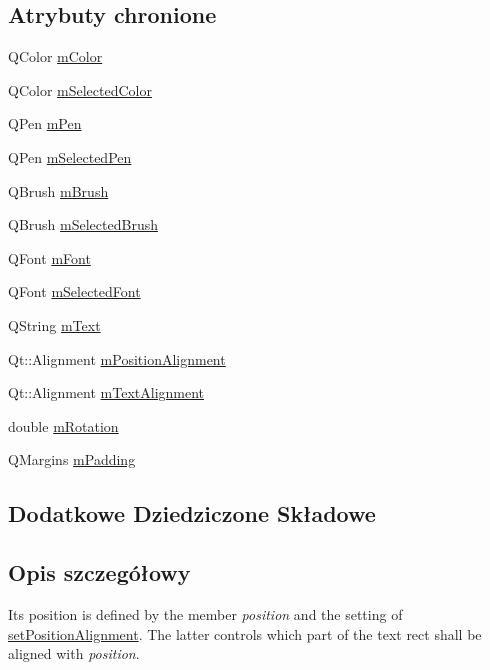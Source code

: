 \subsection*{Atrybuty chronione}
\begin{DoxyCompactItemize}
\item 
Q\+Color \hyperlink{class_q_c_p_item_text_a8407f284ad867f627878cc26ef433d08}{m\+Color}
\item 
Q\+Color \hyperlink{class_q_c_p_item_text_a7eb64e42f5f7998a97d8907ad25933c1}{m\+Selected\+Color}
\item 
Q\+Pen \hyperlink{class_q_c_p_item_text_aa02388705dbbff1bf7b8aa872b5f579c}{m\+Pen}
\item 
Q\+Pen \hyperlink{class_q_c_p_item_text_a8eaec649606d6ead2d8d4dcb5691777c}{m\+Selected\+Pen}
\item 
Q\+Brush \hyperlink{class_q_c_p_item_text_a2535911875faa459b8337f2efccb5cb8}{m\+Brush}
\item 
Q\+Brush \hyperlink{class_q_c_p_item_text_a28ccd097b42a216d81db9c6869f54a59}{m\+Selected\+Brush}
\item 
Q\+Font \hyperlink{class_q_c_p_item_text_a1dc87fe2a824820d549ffd7e644eef8d}{m\+Font}
\item 
Q\+Font \hyperlink{class_q_c_p_item_text_a6702f141fae590b2f4f1ec02fe9f8bd5}{m\+Selected\+Font}
\item 
Q\+String \hyperlink{class_q_c_p_item_text_a2dec3e08c11f51639629374ecec3bd62}{m\+Text}
\item 
Qt\+::\+Alignment \hyperlink{class_q_c_p_item_text_a6c27f7dc1a962a04b32430cf99f04654}{m\+Position\+Alignment}
\item 
Qt\+::\+Alignment \hyperlink{class_q_c_p_item_text_acdb2e50c38e83da00f083771efbd213f}{m\+Text\+Alignment}
\item 
double \hyperlink{class_q_c_p_item_text_ac37df0061552225d2277e1ee3b48f2cb}{m\+Rotation}
\item 
Q\+Margins \hyperlink{class_q_c_p_item_text_ae7b3ef0ce6046efd4b346d28f2e1fb67}{m\+Padding}
\end{DoxyCompactItemize}
\subsection*{Dodatkowe Dziedziczone Składowe}


\subsection{Opis szczegółowy}
 Its position is defined by the member {\itshape position} and the setting of \hyperlink{class_q_c_p_item_text_a781cdf8c640fc6a055dcff1e675c8c7a}{set\+Position\+Alignment}. The latter controls which part of the text rect shall be aligned with {\itshape position}.

